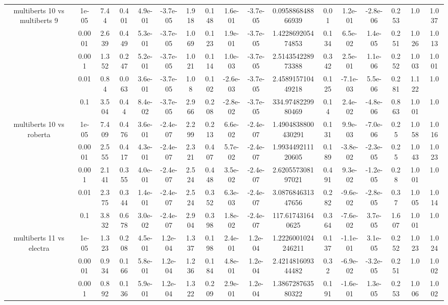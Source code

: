 \begin{tabular}{|c|c|c|c|c|c|c|c|c|c|c|c|c|c|c|c|c|}
\hline
\multirow{5}{*}{multiberts 10 vs multiberts 9} & 1e-05 & 7.44 & 0.401 & 4.9e-01 & -3.7e-05 & 1.918 & 0.148 & 1.6e-01 & -3.7e-05 & 0.095886848866939 & 0.01 & 1.2e-01 & -2.8e-06 & 0.253 & 1.0 & 1.037 \\
 & 0.0001 & 2.639 & 0.449 & 5.3e-01 & -3.7e-05 & 1.069 & 0.123 & 1.9e-01 & -3.7e-05 & 1.422869205474853 & 0.134 & 6.5e-02 & 1.4e-05 & 0.251 & 1.026 & 1.013 \\
 & 0.001 & 1.352 & 0.247 & 5.2e-01 & -3.7e-05 & 1.021 & 0.114 & 1.0e-03 & -3.7e-05 & 2.514354228973388 & 0.342 & 2.5e-01 & 1.1e-06 & 0.252 & 1.003 & 1.001 \\
 & 0.01 & 0.84 & 0.063 & 3.6e-01 & -3.7e-05 & 1.08 & 0.102 & -2.6e-03 & -3.7e-05 & 2.458915710449218 & 0.125 & -7.1e-03 & 5.5e-06 & 0.281 & 1.122 & 1.0 \\
 & 0.1 & 3.504 & 0.44 & 8.4e-02 & -3.7e-05 & 2.966 & 0.208 & -2.8e-02 & -3.7e-05 & 334.9748229980469 & 0.14 & 2.4e-02 & -4.8e-06 & 0.863 & 1.001 & 1.0 \\
\hline
\multirow{5}{*}{multiberts 10 vs roberta } & 1e-05 & 7.409 & 0.476 & 3.6e-01 & -2.4e-07 & 2.299 & 0.213 & 6.6e-02 & -2.4e-07 & 1.4904838800430291 & 0.131 & 9.9e-03 & -7.0e-06 & 0.25 & 1.058 & 1.016 \\
 & 0.0001 & 2.555 & 0.417 & 4.3e-01 & -2.4e-07 & 2.321 & 0.407 & 5.7e-02 & -2.4e-07 & 1.993449211120605 & 0.189 & -3.8e-02 & -2.3e-05 & 0.25 & 1.043 & 1.023 \\
 & 0.001 & 2.141 & 0.355 & 4.0e-01 & -2.4e-07 & 2.524 & 0.448 & 3.5e-02 & -2.4e-07 & 2.620557308197021 & 0.491 & 9.3e-02 & -1.2e-05 & 0.28 & 1.001 & 1.0 \\
 & 0.01 & 2.375 & 0.344 & 1.4e-01 & -2.4e-07 & 2.524 & 0.352 & 6.3e-03 & -2.4e-07 & 3.087684631347656 & 0.282 & -9.6e-02 & -2.8e-05 & 0.37 & 1.005 & 1.014 \\
 & 0.1 & 3.832 & 0.678 & 3.0e-02 & -2.4e-07 & 2.904 & 0.398 & 1.8e-02 & -2.4e-07 & 117.617431640625 & 0.364 & -7.6e-02 & 3.7e-05 & 1.607 & 1.001 & 1.0 \\
\hline
\multirow{5}{*}{multiberts 11 vs electra } & 1e-05 & 1.323 & 0.208 & 4.5e-01 & 1.2e-04 & 1.337 & 0.198 & 2.4e-01 & 1.2e-04 & 1.2226001024246211 & 0.137 & -1.1e-01 & 3.1e-05 & 0.252 & 1.023 & 1.024 \\
 & 0.0001 & 0.934 & 0.166 & 5.8e-01 & 1.2e-04 & 1.236 & 0.184 & 4.8e-01 & 1.2e-04 & 2.421481609344482 & 0.32 & -6.9e-02 & -3.2e-05 & 0.251 & 1.0 & 1.002 \\
 & 0.001 & 0.892 & 0.136 & 5.9e-01 & 1.2e-04 & 1.322 & 0.209 & 2.9e-01 & 1.2e-04 & 1.386728763580322 & 0.191 & -1.6e-01 & 1.3e-05 & 0.253 & 1.006 & 1.002 \\

\end{tabular}
